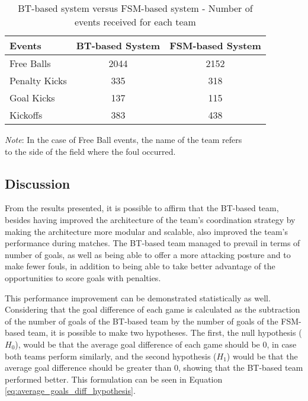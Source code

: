 \begin{table}[h]
    \begin{minipage}{\columnwidth}
        \centering
        \begin{tabular}{l c c}
            \toprule
            Events        & BT-based System & FSM-based System \\
            \midrule
            Free Balls    & 2044            & 2152             \\
            Penalty Kicks & 335             & 318              \\
            Goal Kicks    & 137             & 115              \\
            Kickoffs      & 383             & 438              \\
            \bottomrule
        \end{tabular}
        \begin{center}
            \footnotesize
            \emph{Note}: In the case of Free Ball events, the name of the team refers \\
            to the side of the field where the foul occurred.
        \end{center}
    \end{minipage}
    \caption{BT-based system versus FSM-based system - Number of events received for each team}
    \label{tab:fouls_count}
\end{table}

\subsection{Discussion}

From the results presented, it is possible to affirm that the BT-based team, besides having improved the architecture of the team's coordination strategy by making the architecture more modular and scalable, also improved the team's performance during matches. The BT-based team managed to prevail in terms of number of goals, as well as being able to offer a more attacking posture and to make fewer fouls, in addition to being able to take better advantage of the opportunities to score goals with penalties.

This performance improvement can be demonstrated statistically as well. Considering that the goal difference of each game is calculated as the subtraction of the number of goals of the BT-based team by the number of goals of the FSM-based team, it is possible to make two hypotheses. The first, the null hypothesis ($H_0$), would be that the average goal difference of each game should be 0, in case both teams perform similarly, and the second hypothesis ($H_1$) would be that the average goal difference should be greater than 0, showing that the BT-based team performed better. This formulation can be seen in Equation \ref{eq:average_goals_diff_hypothesis}.

